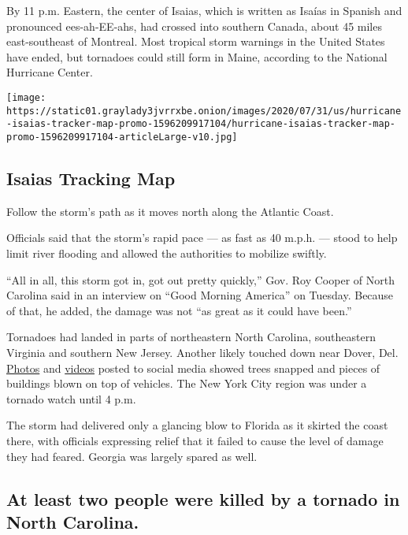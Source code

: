 By 11 p.m. Eastern, the center of Isaias, which is written as Isaías in
Spanish and pronounced ees-ah-EE-ahs, had crossed into southern Canada,
about 45 miles east-southeast of Montreal. Most tropical storm warnings
in the United States have ended, but tornadoes could still form in
Maine, according to the National Hurricane Center.

\href{https://www.nytimes3xbfgragh.onion/interactive/2020/07/31/us/hurricane-isaias-tracker-map.html}{}

\texttt{[image: https://static01.graylady3jvrrxbe.onion/images/2020/07/31/us/hurricane-isaias-tracker-map-promo-1596209917104/hurricane-isaias-tracker-map-promo-1596209917104-articleLarge-v10.jpg]}

\hypertarget{isaias-tracking-map}{%
\subsection{Isaias Tracking Map}\label{isaias-tracking-map}}

Follow the storm's path as it moves north along the Atlantic Coast.

Officials said that the storm's rapid pace --- as fast as 40 m.p.h. ---
stood to help limit river flooding and allowed the authorities to
mobilize swiftly.

``All in all, this storm got in, got out pretty quickly,'' Gov. Roy
Cooper of North Carolina said in an interview on ``Good Morning
America'' on Tuesday. Because of that, he added, the damage was not ``as
great as it could have been.''

Tornadoes had landed in parts of northeastern North Carolina,
southeastern Virginia and southern New Jersey. Another likely touched
down near Dover, Del.
\href{https://slack-redir.net/link?url=https\%3A\%2F\%2Ftwitter.com\%2FRichWirdzekWx\%2Fstatus\%2F1290684400825438208}{Photos}
and
\href{https://slack-redir.net/link?url=https\%3A\%2F\%2Ftwitter.com\%2FDKDRinc\%2Fstatus\%2F1290688365830995969}{videos}
posted to social media showed trees snapped and pieces of buildings
blown on top of vehicles. The New York City region was under a tornado
watch until 4 p.m.

The storm had delivered only a glancing blow to Florida as it skirted
the coast there, with officials expressing relief that it failed to
cause the level of damage they had feared. Georgia was largely spared as
well.

\hypertarget{at-least-two-people-were-killed-by-a-tornado-in-north-carolina}{%
\subsection{At least two people were killed by a tornado in North
Carolina.}\label{at-least-two-people-were-killed-by-a-tornado-in-north-carolina}}

